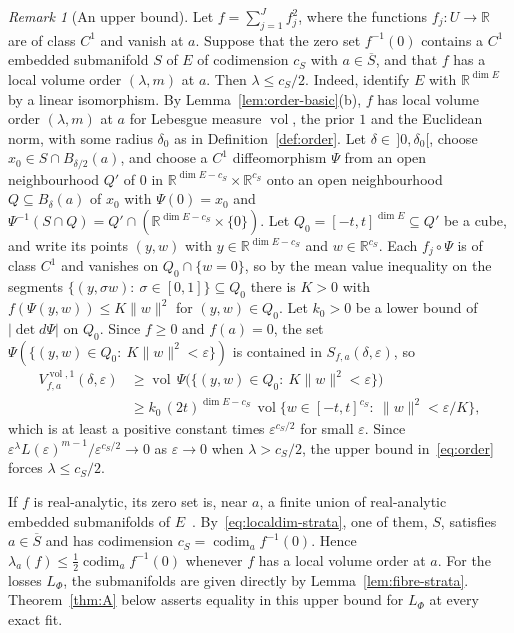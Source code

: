 \documentclass[11pt,a4paper]{article}
\theoremstyle{definition}
\theoremstyle{remark}
\newtheorem{remark}[theorem]{Remark}
\numberwithin{equation}{section}
\newcommand{\R}{\mathbb{R}}
\newcommand{\codim}{\operatorname{codim}}
\newcommand{\vol}{\operatorname{vol}}
\newcommand{\norm}[1]{\lVert #1\rVert}
\newcommand{\abs}[1]{\lvert #1\rvert}
\newcommand{\eps}{\varepsilon}
\begin{document}
\begin{remark}[An upper bound]\label{rem:upper}
Let $f=\sum_{j=1}^Jf_j^2$, where the functions $f_j:U\to\R$ are of class $C^1$ and vanish at $a$. Suppose that the zero set $f^{-1}(0)$ contains a $C^1$ embedded submanifold $S$ of $E$ of codimension $c_S$ with $a\in\overline S$, and that $f$ has a local volume order $(\lambda,m)$ at $a$. Then $\lambda\le c_S/2$. Indeed, identify $E$ with $\R^{\dim E}$ by a linear isomorphism. By Lemma~\ref{lem:order-basic}(b), $f$ has local volume order $(\lambda,m)$ at $a$ for Lebesgue measure $\vol$, the prior $1$ and the Euclidean norm, with some radius $\delta_0$ as in Definition~\ref{def:order}. Let $\delta\in\,]0,\delta_0[$, choose $x_0\in S\cap B_{\delta/2}(a)$, and choose a $C^1$ diffeomorphism $\Psi$ from an open neighbourhood $Q'$ of $0$ in $\R^{\dim E-c_S}\times\R^{c_S}$ onto an open neighbourhood $Q\subseteq B_\delta(a)$ of $x_0$ with $\Psi(0)=x_0$ and $\Psi^{-1}(S\cap Q)=Q'\cap(\R^{\dim E-c_S}\times\{0\})$. Let $Q_0=[-t,t]^{\dim E}\subseteq Q'$ be a cube, and write its points $(y,w)$ with $y\in\R^{\dim E-c_S}$ and $w\in\R^{c_S}$. Each $f_j\circ\Psi$ is of class $C^1$ and vanishes on $Q_0\cap\{w=0\}$, so by the mean value inequality on the segments $\{(y,\sigma w):\ \sigma\in[0,1]\}\subseteq Q_0$ there is $K>0$ with $f(\Psi(y,w))\le K\norm w^2$ for $(y,w)\in Q_0$. Let $k_0>0$ be a lower bound of $\abs{\det d\Psi}$ on $Q_0$. Since $f\ge0$ and $f(a)=0$, the set $\Psi(\{(y,w)\in Q_0:\ K\norm w^2<\eps\})$ is contained in $S_{f,a}(\delta,\eps)$, so
\begin{align*}
V^{\vol,1}_{f,a}(\delta,\eps)&\ge\vol\,\Psi\bigl(\{(y,w)\in Q_0:\ K\norm w^2<\eps\}\bigr)\\
&\ge k_0\,(2t)^{\dim E-c_S}\,\vol\{w\in[-t,t]^{c_S}:\ \norm w^2<\eps/K\},
\end{align*}
which is at least a positive constant times $\eps^{c_S/2}$ for small $\eps$. Since $\eps^\lambda L(\eps)^{m-1}/\eps^{c_S/2}\to0$ as $\eps\to0$ when $\lambda>c_S/2$, the upper bound in~\eqref{eq:order} forces $\lambda\le c_S/2$.

If $f$ is real-analytic, its zero set is, near $a$, a finite union of real-analytic embedded submanifolds of $E$~\cite{bierstone-milman}. By~\eqref{eq:localdim-strata}, one of them, $S$, satisfies $a\in\overline S$ and has codimension $c_S=\codim_af^{-1}(0)$. Hence $\lambda_a(f)\le\frac12\codim_af^{-1}(0)$ whenever $f$ has a local volume order at $a$. For the losses $L_\Phi$, the submanifolds are given directly by Lemma~\ref{lem:fibre-strata}. Theorem~\ref{thm:A} below asserts equality in this upper bound for $L_\Phi$ at every exact fit.
\end{remark}
\end{document}
